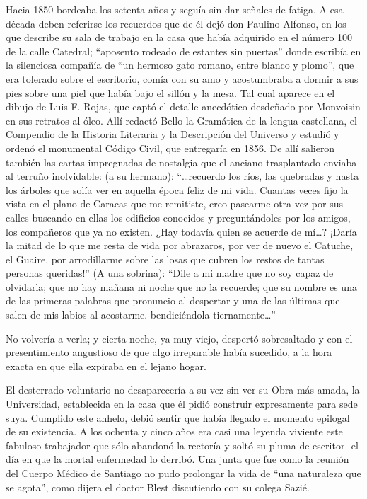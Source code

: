 \documentclass[10pt,twoside,openright]{memoir}
\begin{document}
Hacia 1850 bordeaba los setenta años y seguía sin dar señales de fatiga.
A esa década deben referirse los recuerdos que de él dejó don Paulino
Alfonso, en los que describe su sala de trabajo en la casa que había
adquirido en el número 100 de la calle Catedral; ``aposento rodeado de
estantes sin puertas'' donde escribía en la silenciosa compañía de ``un
hermoso gato romano, entre blanco y plomo'', que era tolerado sobre el
escritorio, comía con su amo y acostumbraba a dormir a sus pies sobre
una piel que había bajo el sillón y la mesa. Tal cual aparece en el
dibujo de Luis F. Rojas, que captó el detalle anecdótico desdeñado por
Monvoisin en sus retratos al óleo. Allí redactó Bello la Gramática de la
lengua castellana, el Compendio de la Historia Literaria y la
Descripción del Universo y estudió y ordenó el monumental Código Civil,
que entregaría en 1856. De allí salieron también las cartas impregnadas
de nostalgia que el anciano trasplantado enviaba al terruño inolvidable:
(a su hermano): ``\ldots recuerdo los ríos, las quebradas y hasta los árboles
que solía ver en aquella época feliz de mi vida. Cuantas veces fijo la
vista en el plano de Caracas que me remitiste, creo pasearme otra vez
por sus calles buscando en ellas los edificios conocidos y
preguntándoles por los amigos, los compañeros que ya no existen. ¿Hay
todavía quien se acuerde de mí\ldots? ¡Daría la mitad de lo que me resta de
vida por abrazaros, por ver de nuevo el Catuche, el Guaire, por
arrodillarme sobre las losas que cubren los restos de tantas personas
queridas!'' (A una sobrina): ``Dile a mi madre que no soy capaz de
olvidarla; que no hay mañana ni noche que no la recuerde; que su nombre
es una de las primeras palabras que pronuncio al despertar y una de las
últimas que salen de mis labios al acostarme. bendiciéndola
tiernamente\ldots''

No volvería a verla; y cierta noche, ya muy viejo, despertó sobresaltado
y con el presentimiento angustioso de que algo irreparable había
sucedido, a la hora exacta en que ella expiraba en el lejano hogar.

El desterrado voluntario no desaparecería a su vez sin ver su Obra más
amada, la Universidad, establecida en la casa que él pidió construir
expresamente para sede suya. Cumplido este anhelo, debió sentir que
había llegado el momento epilogal de su existencia. A los ochenta y
cinco años era casi una leyenda viviente este fabuloso trabajador que
sólo abandonó la rectoría y soltó su pluma de escritor -el día en que la
mortal enfermedad lo derribó. Una junta que fue como la reunión del
Cuerpo Médico de Santiago no pudo prolongar la vida de ``una naturaleza
que se agota'', como dijera el doctor Blest discutiendo con su colega
Sazié.
\end{document}
